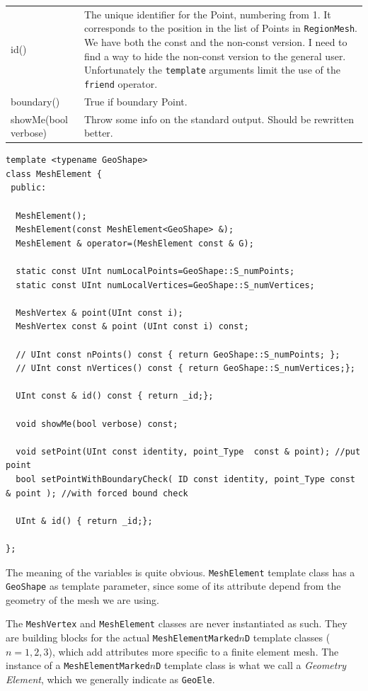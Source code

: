 \begin{tabularx}{\textwidth}{lX} 
\hline 
id() & The unique identifier for the Point, numbering from 1.
  It corresponds to the position in the list of Points in
  \texttt{RegionMesh}. We have both the const and the non-const
  version. I need to find a way to hide the non-const version to the
  general user.  Unfortunately the \texttt{template} arguments limit
  the use of the
  \texttt{friend} operator.\\
  boundary() & True if boundary Point.\\
  showMe(bool verbose) & Throw some info on the standard output. Should be rewritten better.\\
\hline
\end{tabularx}

\begin{verbatim}
template <typename GeoShape>
class MeshElement {
 public:
  
  MeshElement();
  MeshElement(const MeshElement<GeoShape> &);
  MeshElement & operator=(MeshElement const & G); 
  
  static const UInt numLocalPoints=GeoShape::S_numPoints;
  static const UInt numLocalVertices=GeoShape::S_numVertices;
  
  MeshVertex & point(UInt const i); 
  MeshVertex const & point (UInt const i) const;
  
  // UInt const nPoints() const { return GeoShape::S_numPoints; };
  // UInt const nVertices() const { return GeoShape::S_numVertices;};
  
  UInt const & id() const { return _id;}; 
  
  void showMe(bool verbose) const;
  
  void setPoint(UInt const identity, point_Type  const & point); //put point 
  bool setPointWithBoundaryCheck( ID const identity, point_Type const & point ); //with forced bound check
  
  UInt & id() { return _id;};
  
};
\end{verbatim}
The meaning of the variables is quite obvious. \texttt{MeshElement} template class
has a \texttt{GeoShape} as template parameter, since some of its
attribute depend from the geometry of the mesh we are using.

The \texttt{MeshVertex} and \texttt{MeshElement} classes are never instantiated
as such. They are building blocks for the actual
\texttt{MeshElementMarked$n$D} template classes ($n=1,2,3$), which add
attributes more specific to a finite element mesh. The instance of a
\texttt{MeshElementMarked$n$D} template class is what we call a
\emph{Geometry Element}, which we generally
indicate as \texttt{GeoEle}.

